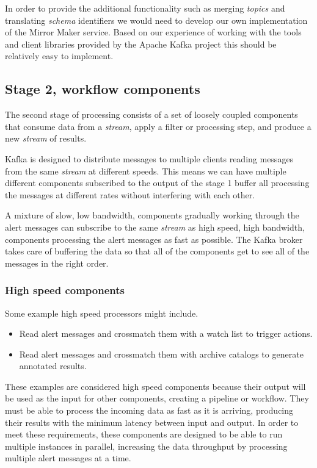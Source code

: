\documentclass{article}
\newcommand{\kafka} {Kafka\xspace}
\newcommand{\kftopics} {\textit{topics}\xspace}
\newcommand{\kfstream} {\textit{stream}\xspace}
\newcommand{\apache} {Apache\xspace}
\newcommand{\crossmatch} {crossmatch\xspace}
\newcommand{\catalogs} {catalogs\xspace}
\newcommand{\avschema} {\textit{schema}\xspace}
\newcommand{\mirrormaker} {Mirror Maker\xspace}
\newcommand{\stageone} {stage 1\xspace}
\begin{document}
In order to provide the additional functionality such as merging \kftopics and translating \avschema identifiers  we would need to develop our own implementation of the \mirrormaker service.
Based on our experience of working with the tools and client libraries provided by the \apache \kafka project this should be relatively easy to implement.

\subsection{Stage 2, workflow components}
\label{stage-2}
The second stage of processing consists of a set of loosely coupled components that consume data from a \kfstream, apply a filter or processing step, and produce a new \kfstream of results.

\kafka is designed to distribute messages to multiple clients reading messages from the same \kfstream at different speeds. This means we can have multiple different components subscribed to the output of the \stageone buffer all processing the messages at different rates without interfering with each other.

A mixture of slow, low bandwidth, components gradually working through the alert messages can subscribe to the same \kfstream as high speed, high bandwidth, components processing the alert messages as fast as possible. The \kafka broker takes care of buffering the data so that all of the components get to see all of the messages in the right order.

\subsubsection{High speed components}
\label{stage-2.high-speed.components}

Some example high speed processors might include.
\begin{itemize}
  \item Read alert messages and \crossmatch them with a watch list to trigger actions.
  \item Read alert messages and \crossmatch them with archive \catalogs to generate annotated results.
\end{itemize}

These examples are considered high speed components because their output will be used as the input for other components, creating a pipeline or workflow.
They must be able to process the incoming data as fast as it is arriving, producing their results with the minimum latency between input and output.
In order to meet these requirements, these components are designed to be able to run multiple instances in parallel, increasing the data throughput by processing multiple alert messages at a time.
\end{document}
